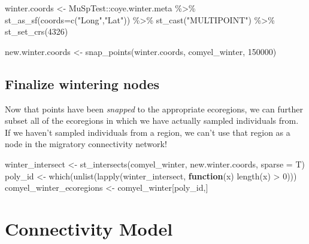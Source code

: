 \documentclass[
]{book}
\newenvironment{Shaded}{\begin{snugshade}}{\end{snugshade}}
\newcommand{\AttributeTok}[1]{\textcolor[rgb]{0.77,0.63,0.00}{#1}}
\newcommand{\ControlFlowTok}[1]{\textcolor[rgb]{0.13,0.29,0.53}{\textbf{#1}}}
\newcommand{\DecValTok}[1]{\textcolor[rgb]{0.00,0.00,0.81}{#1}}
\newcommand{\FunctionTok}[1]{\textcolor[rgb]{0.00,0.00,0.00}{#1}}
\newcommand{\NormalTok}[1]{#1}
\newcommand{\OtherTok}[1]{\textcolor[rgb]{0.56,0.35,0.01}{#1}}
\newcommand{\SpecialCharTok}[1]{\textcolor[rgb]{0.00,0.00,0.00}{#1}}
\newcommand{\StringTok}[1]{\textcolor[rgb]{0.31,0.60,0.02}{#1}}
\begin{document}
\begin{Shaded}
\begin{Highlighting}[]
\NormalTok{winter.coords }\OtherTok{\textless{}{-}}\NormalTok{ MuSpTest}\SpecialCharTok{::}\NormalTok{coye.winter.meta }\SpecialCharTok{\%\textgreater{}\%}
  \FunctionTok{st\_as\_sf}\NormalTok{(}\AttributeTok{coords=}\FunctionTok{c}\NormalTok{(}\StringTok{"Long"}\NormalTok{,}\StringTok{"Lat"}\NormalTok{)) }\SpecialCharTok{\%\textgreater{}\%}
  \FunctionTok{st\_cast}\NormalTok{(}\StringTok{"MULTIPOINT"}\NormalTok{) }\SpecialCharTok{\%\textgreater{}\%}
  \FunctionTok{st\_set\_crs}\NormalTok{(}\DecValTok{4326}\NormalTok{)}
  
\NormalTok{new.winter.coords }\OtherTok{\textless{}{-}} \FunctionTok{snap\_points}\NormalTok{(winter.coords, comyel\_winter, }\DecValTok{150000}\NormalTok{)}
\end{Highlighting}
\end{Shaded}

\hypertarget{finalize-wintering-nodes}{%
\section{Finalize wintering nodes}\label{finalize-wintering-nodes}}

Now that points have been \emph{snapped} to the appropriate ecoregions, we can further subset all of the ecoregions in which we have actually sampled individuals from. If we haven't sampled individuals from a region, we can't use that region as a node in the migratory connectivity network!

\begin{Shaded}
\begin{Highlighting}[]
\NormalTok{winter\_intersect }\OtherTok{\textless{}{-}} \FunctionTok{st\_intersects}\NormalTok{(comyel\_winter, new.winter.coords, }\AttributeTok{sparse =}\NormalTok{ T)}
\NormalTok{poly\_id }\OtherTok{\textless{}{-}} \FunctionTok{which}\NormalTok{(}\FunctionTok{unlist}\NormalTok{(}\FunctionTok{lapply}\NormalTok{(winter\_intersect, }\ControlFlowTok{function}\NormalTok{(x) }\FunctionTok{length}\NormalTok{(x) }\SpecialCharTok{\textgreater{}} \DecValTok{0}\NormalTok{)))}
\NormalTok{comyel\_winter\_ecoregions }\OtherTok{\textless{}{-}}\NormalTok{ comyel\_winter[poly\_id,]}
\end{Highlighting}
\end{Shaded}

\hypertarget{connectivity}{%
\chapter{Connectivity Model}\label{connectivity}}
\end{document}
